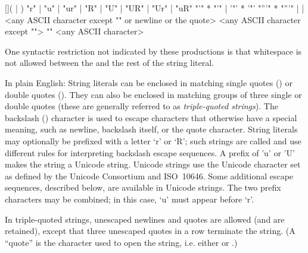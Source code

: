 \begin{productionlist}
             {[]( | )}
             {"r" | "u" | "ur" | "R" | "U" | "UR" | "Ur" | "uR"}
             {"'" * "'"
              | '"' * '"'}
             {"'''" * "'''"}
             { | }
             { | }
             {<any ASCII character except "\e" or newline or the quote>}
             {<any ASCII character except "\e">}
             {"\e" <any ASCII character>}
\end{productionlist}

One syntactic restriction not indicated by these productions is that
whitespace is not allowed between the  and
the rest of the string literal.

In plain English: String literals can be enclosed in matching single
quotes () or double quotes ().  They can also be
enclosed in matching groups of three single or double quotes (these
are generally referred to as \emph{triple-quoted strings}).  The
backslash (\code{\e}) character is used to escape characters that
otherwise have a special meaning, such as newline, backslash itself,
or the quote character.  String literals may optionally be prefixed
with a letter `r' or `R'; such strings are called  and use different rules for interpreting
backslash escape sequences.  A prefix of 'u' or 'U' makes the string
a Unicode string.  Unicode strings use the Unicode character set as
defined by the Unicode Consortium and ISO~10646.  Some additional
escape sequences, described below, are available in Unicode strings.
The two prefix characters may be combined; in this case, `u' must
appear before `r'.

In triple-quoted strings,
unescaped newlines and quotes are allowed (and are retained), except
that three unescaped quotes in a row terminate the string.  (A
``quote'' is the character used to open the string, i.e. either
 or .)

